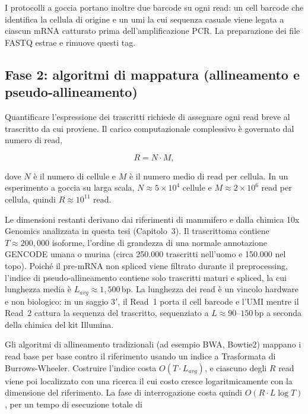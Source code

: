 I protocolli a goccia portano inoltre due barcode su ogni read: un cell barcode che identifica la cellula di origine e un \gls{umi} la cui sequenza casuale viene legata a ciascun mRNA catturato prima dell'amplificazione PCR. La preparazione dei file FASTQ estrae e rimuove questi tag.


\subsection{Fase 2: algoritmi di mappatura (allineamento e pseudo-allineamento)}
Quantificare l'espressione dei trascritti richiede di assegnare ogni read breve al trascritto da cui proviene. Il carico computazionale complessivo è governato dal numero di read,

$$R = N \cdot M,$$

dove $N$ è il numero di cellule e $M$ è il numero medio di read per cellula. In un esperimento a goccia su larga scala, $N \approx 5 \times 10^4$ cellule e $M \approx 2 \times 10^6$ read per cellula, quindi $R \approx 10^{11}$ read.

Le dimensioni restanti derivano dai riferimenti di mammifero e dalla chimica 10x Genomics analizzata in questa tesi (Capitolo~3). Il trascrittoma contiene $T \approx 200{,}000$ isoforme, l'ordine di grandezza di una normale annotazione GENCODE umana o murina (circa 250.000 trascritti nell'uomo e 150.000 nel topo). Poiché il pre-mRNA non spliced viene filtrato durante il preprocessing, l'indice di pseudo-allineamento contiene solo trascritti maturi e spliced, la cui lunghezza media è $L_{avg} \approx 1{,}500$\,bp. La lunghezza dei read è un vincolo hardware e non biologico: in un saggio $3'$, il Read~1 porta il cell barcode e l'UMI mentre il Read~2 cattura la sequenza del trascritto, sequenziato a $L \approx 90$--$150$\,bp a seconda della chimica del kit Illumina.

Gli algoritmi di allineamento tradizionali (ad esempio BWA, Bowtie2) mappano i read base per base contro il riferimento usando un indice a Trasformata di Burrows-Wheeler. Costruire l'indice costa $O(T \cdot L_{avg})$, e ciascuno degli $R$ read viene poi localizzato con una ricerca il cui costo cresce logaritmicamente con la dimensione del riferimento. La fase di interrogazione costa quindi $O(R \cdot L \log T)$, per un tempo di esecuzione totale di

